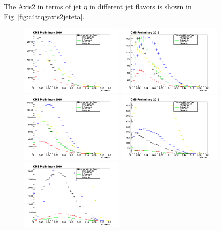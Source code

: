 The Axis2 in terms of jet $\eta$ in different jet flavors is shown in Fig~\ref{fig:c4ttqgaxis2jeteta}.
\begin{figure}[htbp]
 \begin{center}
  \includegraphics[width=0.45\textwidth]{sections/mc4/TopTagger/figures/_b_qgaxis2jetetabin0_.png}
  \includegraphics[width=0.45\textwidth]{sections/mc4/TopTagger/figures/_b_qgaxis2jetetabin1_.png} \\
  \includegraphics[width=0.45\textwidth]{sections/mc4/TopTagger/figures/_b_qgaxis2jetetabin2_.png}
  \includegraphics[width=0.45\textwidth]{sections/mc4/TopTagger/figures/_b_qgaxis2jetetabin3_.png} \\
  \includegraphics[width=0.45\textwidth]{sections/mc4/TopTagger/figures/_b_qgaxis2jetetabin4_.png}

\end{center}
\end{figure}
